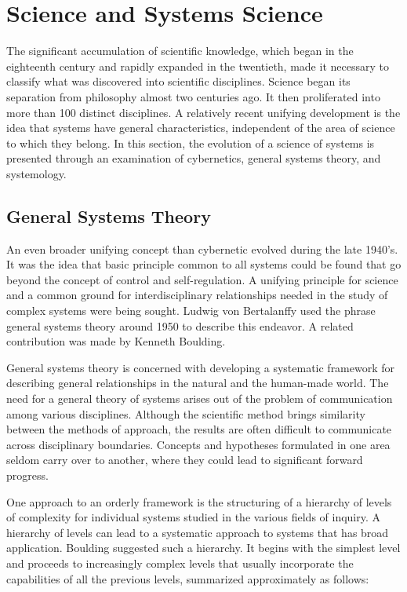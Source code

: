 \section{Science and Systems Science}

The significant accumulation of scientific knowledge, which began in the eighteenth century and rapidly expanded in the twentieth, made it necessary to classify what was discovered into scientific disciplines. Science began its separation from philosophy almost two centuries ago. It then proliferated into more than 100 distinct disciplines. A relatively recent unifying development is the idea that systems have general characteristics, independent of the area of science to which they belong. In this section, the evolution of a science of systems is presented through an examination of cybernetics, general systems theory, and systemology.

\subsection{General Systems Theory}

An even broader unifying concept than cybernetic evolved during the late 1940’s. It was the idea that basic principle common to all systems could be found that go beyond the concept of control and self-regulation. A unifying principle for science and a common ground for interdisciplinary relationships needed in the study of complex systems were being sought. Ludwig von Bertalanffy used the phrase general systems theory around 1950 to describe this endeavor. A related contribution was made by Kenneth Boulding.

General systems theory is concerned with developing a systematic framework for describing general relationships in the natural and the human-made world. The need for a general theory of systems arises out of the problem of communication among various disciplines. Although the scientific method brings similarity between the methods of approach, the results are often difficult to communicate across disciplinary boundaries. Concepts and hypotheses formulated in one area seldom carry over to another, where they could lead to significant forward progress.

One approach to an orderly framework is the structuring of a hierarchy of levels of complexity for individual systems studied in the various fields of inquiry. A hierarchy of levels can lead to a systematic approach to systems that has broad application. Boulding suggested such a hierarchy. It begins with the simplest level and proceeds to increasingly complex levels that usually incorporate the capabilities of all the previous levels, summarized approximately as follows:

